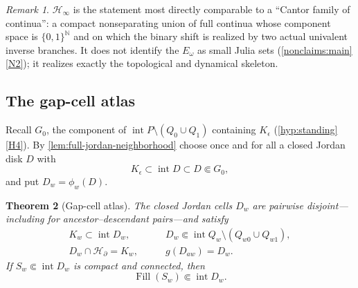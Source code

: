 \documentclass[11pt,reqno]{amsart}
\numberwithin{equation}{section}
\theoremstyle{plain}
\newtheorem{theorem}{Theorem}[section]
\theoremstyle{definition}
\theoremstyle{remark}
\newtheorem{remark}[theorem]{Remark}
\DeclareMathOperator{\Fill}{Fill}
\newcommand{\N}{\mathbb N}
\newcommand{\HB}{\mathcal H_\partial}
\newcommand{\HE}{\mathcal H_\infty}
\newcommand{\rootK}{K_{\epsilon}}
\begin{document}
\begin{remark}
$\HE$ is the statement most directly comparable to a ``Cantor family of
continua'': a compact nonseparating union of full continua whose
component space is $\{0,1\}^{\N}$ and on which the binary shift is
realized by two actual univalent inverse branches.  It does not
identify the $E_\omega$ as small Julia sets
(\cref{nonclaims:main}\ref{N2}); it realizes exactly the topological
and dynamical skeleton.
\end{remark}

\subsection{The gap-cell atlas}

Recall $G_0$, the component of
$\operatorname{int}P\setminus(Q_0\cup Q_1)$ containing $\rootK$
(\cref{hyp:standing}\ref{H4}).  By
\cref{lem:full-jordan-neighborhood} choose once and for all a closed
Jordan disk $D$ with
\begin{equation}
 \rootK\subset\operatorname{int}D\subset D\Subset G_0,
\label{eq:root-cell}
\end{equation}
and put $D_w=\phi_w(D)$.

\begin{theorem}[Gap-cell atlas]
\label{thm:gap-cells}
The closed Jordan cells $D_w$ are pairwise disjoint---including for
ancestor--descendant pairs---and satisfy
\begin{align}
 K_w\subset\operatorname{int}D_w,
 \qquad
 &D_w\Subset
 \operatorname{int}Q_w\setminus(Q_{w0}\cup Q_{w1}),
\label{eq:cell-location}\\
 D_w\cap\HB=K_w,
 \qquad
 &g(D_{aw})=D_w .
\label{eq:cell-trace}
\end{align}
If $S_w\Subset\operatorname{int}D_w$ is compact and connected, then
\begin{equation}
 \Fill(S_w)\Subset\operatorname{int}D_w .
\label{eq:cell-fill}
\end{equation}
\end{theorem}
\end{document}
